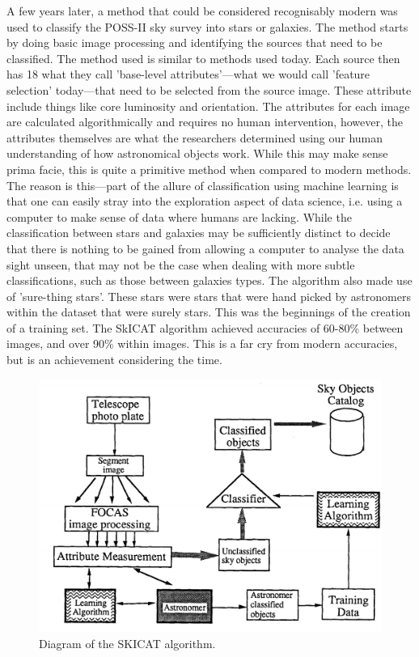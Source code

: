 \documentclass[a4paper,11pt]{article}
\begin{document}
A few years later, a method that could be considered recognisably modern was used to classify the POSS-II sky survey into stars or galaxies.\cite{fayyad_1993_applying} The method starts by doing basic image processing and identifying the sources that need to be classified. The method used is similar to methods used today. Each source then has 18 what they call 'base-level attributes'—what we would call 'feature selection' today—that need to be selected from the source image. These attribute include things like core luminosity and orientation. The attributes for each image are calculated algorithmically and requires no human intervention, however, the attributes themselves are what the researchers determined using our human understanding of how astronomical objects work. While this may make sense prima facie, this is quite a primitive method when compared to modern methods. The reason is this—part of the allure of classification using machine learning is that one can easily stray into the exploration aspect of data science, i.e. using a computer to make sense of data where humans are lacking. While the classification between stars and galaxies may be sufficiently distinct to decide that there is nothing to be gained from allowing a computer to analyse the data sight unseen, that may not be the case when dealing with more subtle classifications, such as those between galaxies types. The algorithm also made use of 'sure-thing stars'. These stars were stars that were hand picked by astronomers within the dataset that were surely stars. This was the beginnings of the creation of a training set. The SkICAT algorithm achieved accuracies of 60-80\% between images, and over 90\% within images. This is a far cry from modern accuracies, but is an achievement considering the time.
\begin{figure}[ht]
\centering
\includegraphics[width=\textwidth]{SkICAT.png}
\caption{\label{fig:SkiCAT}Diagram of the SKICAT algorithm.}
\end{figure}
\end{document}
